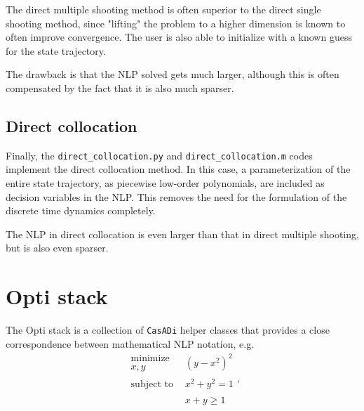 \documentclass[a4paper,12pt]{book}
\newcommand{\CasADi}{\texttt{CasADi}\xspace}
\begin{document}
The direct multiple shooting method is often superior to the direct single
shooting method, since "lifting" the problem to a higher dimension is known
to often improve convergence. The user is also able to initialize with
a known guess for the state trajectory.

The drawback is that the NLP solved gets much larger, although this is often
compensated by the fact that it is also much sparser.

\section{Direct collocation}
Finally, the \verb|direct_collocation.py| and \verb|direct_collocation.m|
codes implement the direct collocation method. In this case, a parameterization
of the entire state trajectory, as piecewise low-order polynomials, are included
as decision variables in the NLP. This removes the need for the formulation
of the discrete time dynamics completely.

The NLP in direct collocation is even larger than that in direct multiple shooting,
but is also even sparser.

\chapter{Opti stack}

The Opti stack is a collection of \CasADi helper classes that provides a close correspondence between mathematical NLP notation, e.g.
\begin{equation} \label{eq:simple_nlp}
\begin{array}{cc}
\begin{array}{c}
\text{minimize} \\
x,y
\end{array}
&
(y-x^2)^2  \\
\begin{array}{c}
\text{subject to}
\end{array}
& x^2+y^2=1 \\
& x+y \ge 1
\end{array},
\end{equation}
\end{document}
